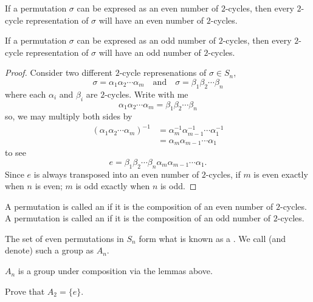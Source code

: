 \documentclass{ximera}
\begin{document}
\begin{lemma}
  If a permutation $\sigma$ can be expresed as an even number of
  $2$-cycles, then every $2$-cycle representation of $\sigma$ will
  have an even number of $2$-cycles.

  If a permutation $\sigma$ can be expresed as an odd number of
  $2$-cycles, then every $2$-cycle representation of $\sigma$ will
  have an odd number of $2$-cycles.
  \begin{proof}
    Consider two different $2$-cycle represenations of $\sigma\in S_n$,
    \[
    \sigma = \alpha_1\alpha_2\cdots\alpha_m \quad\text{and}\quad \sigma = \beta_1\beta_2\cdots\beta_n 
    \]
    where each $\alpha_i$ and $\beta_i$ are $2$-cycles. Write with me
    \[
    \alpha_1\alpha_2\cdots\alpha_m = \beta_1\beta_2\cdots\beta_n
    \]
    so, we may multiply both sides by
    \begin{align*}
    (\alpha_1\alpha_2\cdots\alpha_m)^{-1} &= \alpha_m^{-1}\alpha_{m-1}^{-1}\cdots\alpha_1^{-1}\\
    &= \alpha_m\alpha_{m-1}\cdots\alpha_1
    \end{align*}
    to see
    \[
    e = \beta_1\beta_2\cdots\beta_n\alpha_m\alpha_{m-1}\cdots\alpha_1.
    \]
    Since $e$ is always transposed into an even number of $2$-cycles,
    if $m$ is even exactly when $n$ is even; $m$ is odd exactly when
    $n$ is odd.
  \end{proof}
\end{lemma}



\begin{definition}
  A permutation is called an  if it is the
  composition of an even number of $2$-cycles. A permutation is called
  an  if it is the composition of an odd number
  of $2$-cycles.
\end{definition}



\begin{definition}
  The set of even permutations in $S_n$ form what is known as a
  . We call (and denote) such a group as $A_n$.
\end{definition}

\begin{remark}
  $A_n$ is a group under composition via the lemmas above.
\end{remark}

\begin{exercise}
  Prove that $A_2 = \{e\}$.
\end{exercise}
\end{document}
